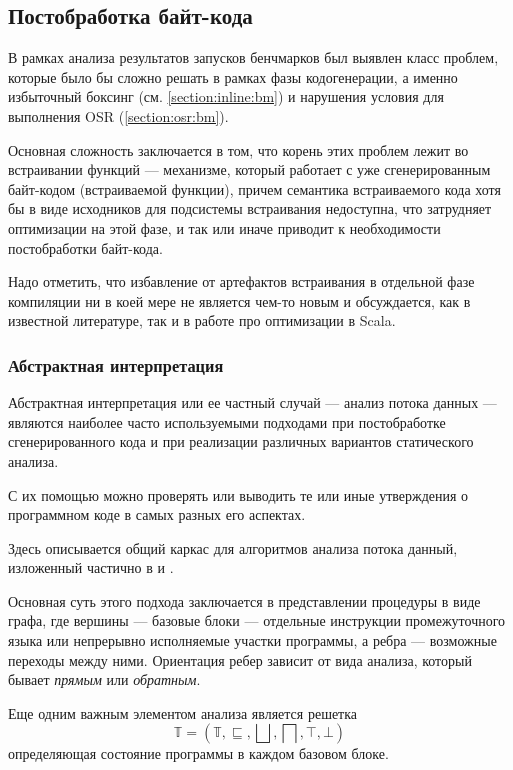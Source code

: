 \subsection{Постобработка байт-кода}
В рамках анализа результатов запусков бенчмарков был выявлен класс проблем, которые было бы сложно
решать в рамках фазы кодогенерации, а именно избыточный боксинг (см. \ref{section:inline:bm}) и
нарушения условия для выполнения OSR (\ref{section:osr:bm}).

Основная сложность заключается в том, что корень этих проблем лежит во встраивании функций ---
механизме, который работает с уже сгенерированным байт-кодом (встраиваемой функции), причем
семантика встраиваемого кода хотя бы в виде исходников для подсистемы встраивания недоступна,
что затрудняет оптимизации на этой фазе, и так или иначе приводит к необходимости постобработки
байт-кода.

Надо отметить, что избавление от артефактов встраивания в отдельной фазе компиляции ни в коей мере
не является чем-то новым и обсуждается, как в известной литературе\cite{Muchnick}, так и в работе
про оптимизации в Scala\cite{ScalaDragos}.

\subsubsection{Абстрактная интерпретация}
Абстрактная интерпретация или ее частный случай --- анализ потока данных --- являются наиболее
часто используемыми подходами при постобработке сгенерированного кода и при реализации
различных вариантов статического анализа.

С их помощью можно проверять или выводить те или иные утверждения о программном коде в самых разных
его аспектах.

Здесь описывается общий каркас для алгоритмов анализа потока данный, изложенный частично в \cite{Muchnick}
и \cite{Nielson}.

Основная суть этого подхода заключается в представлении процедуры в виде графа, где вершины ---
базовые блоки --- отдельные инструкции промежуточного языка или непрерывно исполняемые участки
программы, а ребра --- возможные переходы между ними.
Ориентация ребер зависит от вида анализа, который бывает \textit{прямым} или \textit{обратным}.

Еще одним важным элементом анализа является решетка
$$\mathbb{T} = (\mathbb{T}, \sqsubseteq, \bigsqcup, \bigsqcap, \top, \bot)$$
определяющая состояние программы в каждом базовом блоке.

